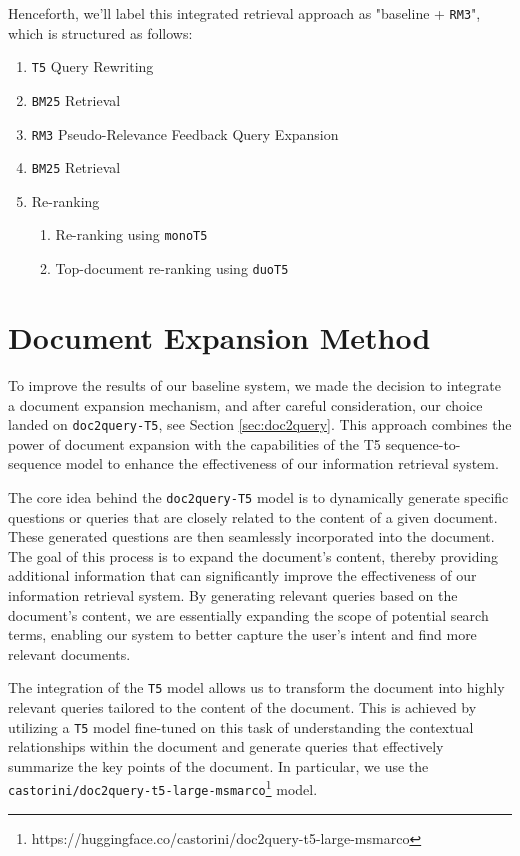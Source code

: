 \documentclass[sigconf]{acmart}
\begin{document}
Henceforth, we'll label this integrated retrieval approach as "baseline + \texttt{RM3}", which is structured as follows:
\begin{enumerate}
	\item	\texttt{T5} Query Rewriting
	\item	\texttt{BM25} Retrieval
	\item	\texttt{RM3} Pseudo-Relevance Feedback Query Expansion
	\item	\texttt{BM25} Retrieval
	\item	Re-ranking
			\begin{enumerate}
				\item	Re-ranking using \texttt{monoT5}
				\item	Top-document re-ranking using \texttt{duoT5}
			\end{enumerate}
\end{enumerate}

\section{Document Expansion Method}\label{sec:doc2query-method}
To improve the results of our baseline system, we made the decision to integrate a document expansion mechanism, and after careful consideration, our choice landed on \texttt{doc2query-T5}, see Section \ref{sec:doc2query}. This approach combines the power of document expansion with the capabilities of the T5 sequence-to-sequence model to enhance the effectiveness of our information retrieval system.

The core idea behind the \texttt{doc2query-T5} model is to dynamically generate specific questions or queries that are closely related to the content of a given document. These generated questions are then seamlessly incorporated into the document. The goal of this process is to expand the document's content, thereby providing additional information that can significantly improve the effectiveness of our information retrieval system. By generating relevant queries based on the document's content, we are essentially expanding the scope of potential search terms, enabling our system to better capture the user's intent and find more relevant documents.

The integration of the \texttt{T5} model allows us to transform the document into highly relevant queries tailored to the content of the document. This is achieved by utilizing a \texttt{T5} model fine-tuned on this task of understanding the contextual relationships within the document and generate queries that effectively summarize the key points of the document. In particular, we use the \texttt{castorini\-/doc2query\--t5\--large\--msmarco}\footnote{https://huggingface.co/castorini/doc2query-t5-large-msmarco} model.
\end{document}
